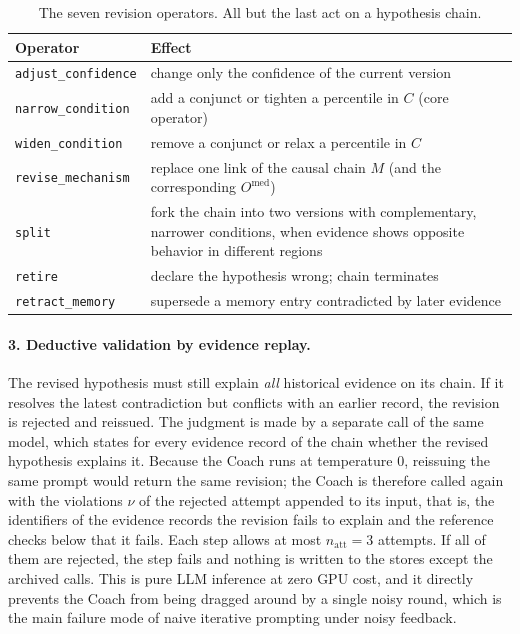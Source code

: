 \documentclass[11pt]{article}
\newcommand{\code}[1]{\texttt{\small #1}}
\begin{document}
\begin{table}[t]
\centering\small
\caption{The seven revision operators. All but the last act on a hypothesis chain.}
\label{tab:ops}
\begin{tabularx}{\linewidth}{@{}l X@{}}
\toprule
Operator & Effect \\
\midrule
\code{adjust\_confidence} & change only the confidence of the current version \\
\code{narrow\_condition} & add a conjunct or tighten a percentile in $C$ (core operator) \\
\code{widen\_condition} & remove a conjunct or relax a percentile in $C$ \\
\code{revise\_mechanism} & replace one link of the causal chain $M$ (and the corresponding $O^{\mathrm{med}}$) \\
\code{split} & fork the chain into two versions with complementary, narrower conditions, when evidence shows opposite behavior in different regions \\
\code{retire} & declare the hypothesis wrong; chain terminates \\
\code{retract\_memory} & supersede a memory entry contradicted by later evidence \\
\bottomrule
\end{tabularx}
\end{table}

\paragraph{3. Deductive validation by evidence replay.}
The revised hypothesis must still explain \emph{all} historical evidence on its chain.
If it resolves the latest contradiction but conflicts with an earlier record, the revision is rejected and reissued.
The judgment is made by a separate call of the same model, which states for every evidence record of the chain whether the revised hypothesis explains it.
Because the Coach runs at temperature 0, reissuing the same prompt would return the same revision; the Coach is therefore called again with the violations $\nu$ of the rejected attempt appended to its input, that is, the identifiers of the evidence records the revision fails to explain and the reference checks below that it fails.
Each step allows at most $n_{\mathrm{att}} = 3$ attempts.
If all of them are rejected, the step fails and nothing is written to the stores except the archived calls.
This is pure LLM inference at zero GPU cost, and it directly prevents the Coach from being dragged around by a single noisy round, which is the main failure mode of naive iterative prompting under noisy feedback.
\end{document}
